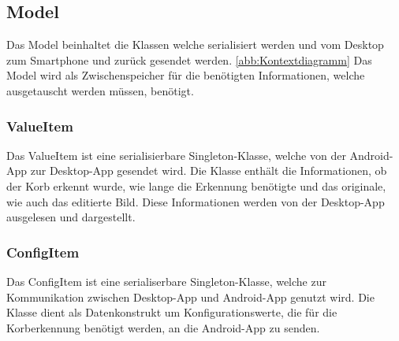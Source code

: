 \subsection{Model}
Das Model beinhaltet die Klassen welche serialisiert werden und vom Desktop zum Smartphone und zurück gesendet werden. \ref{abb:Kontextdiagramm}
Das Model wird als Zwischenspeicher für die benötigten Informationen, welche ausgetauscht werden müssen, benötigt.
\subsubsection{ValueItem}
Das ValueItem ist eine serialisierbare Singleton-Klasse, welche von der Android-App 
zur Desktop-App gesendet wird. Die Klasse enthält die Informationen, ob der Korb 
erkennt wurde, wie lange die Erkennung benötigte und das originale, wie auch das editierte Bild. 
Diese Informationen werden von der Desktop-App ausgelesen und dargestellt. 

\subsubsection{ConfigItem}
Das ConfigItem ist eine serialiserbare Singleton-Klasse, welche zur Kommunikation 
zwischen Desktop-App und Android-App genutzt wird. Die Klasse dient als Datenkonstrukt 
um Konfigurationswerte, die für die Korberkennung benötigt werden, an die Android-App zu senden.

            
            

